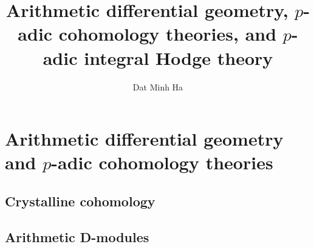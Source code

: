 

\setcounter{section}{-1}





	\title{Arithmetic differential geometry, \texorpdfstring{$p$}{}-adic cohomology theories, and \texorpdfstring{$p$}{}-adic integral Hodge theory}
	
	\author{Dat Minh Ha}
	\maketitle
	
	\begin{abstract}
	    
	\end{abstract}
	
	{
      \hypersetup{} 
      \dominitoc
      \tableofcontents %
    }
    
    \part{Arithmetic differential geometry and \texorpdfstring{$p$}{}-adic cohomology theories}
        \chapter{Crystalline cohomology}
            \begin{abstract}
                
            \end{abstract}
            
            \minitoc
            
            
            
            
            
        \chapter{Arithmetic D-modules}
            \begin{abstract}
                
            \end{abstract}
            
            \minitoc
            
            
            
